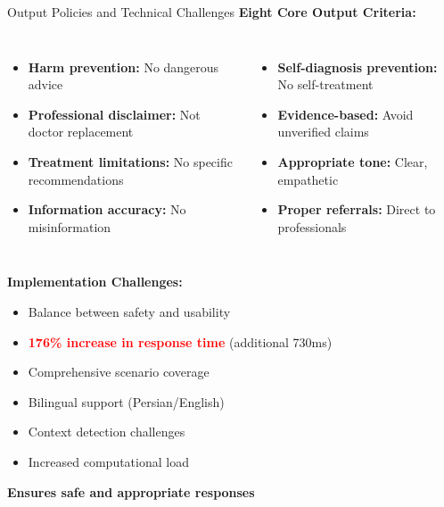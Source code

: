 \begin{frame}{Output Policies and Technical Challenges}
    \textbf{Eight Core Output Criteria:}
    \begin{columns}[T]
        \begin{itemize}
            \footnotesize
            \item \textbf{Harm prevention:} No dangerous advice
            \item \textbf{Professional disclaimer:} Not doctor replacement
            \item \textbf{Treatment limitations:} No specific recommendations
            \item \textbf{Information accuracy:} No misinformation
        \end{itemize}
        
        \begin{itemize}
            \footnotesize
            \item \textbf{Self-diagnosis prevention:} No self-treatment
            \item \textbf{Evidence-based:} Avoid unverified claims
            \item \textbf{Appropriate tone:} Clear, empathetic
            \item \textbf{Proper referrals:} Direct to professionals
        \end{itemize}
    \end{columns}
    
    \vspace{0.5em}
    
    \textbf{Implementation Challenges:}
    \begin{itemize}
        \item Balance between safety and usability
        \item \textcolor{red}{\textbf{176\% increase in response time}} (additional 730ms)
        \item Comprehensive scenario coverage
        \item Bilingual support (Persian/English)
        \item Context detection challenges
        \item Increased computational load
    \end{itemize}
    
    \begin{center}
        \colorbox{green!20}{\textbf{Ensures safe and appropriate responses}}
    \end{center}
\end{frame}

